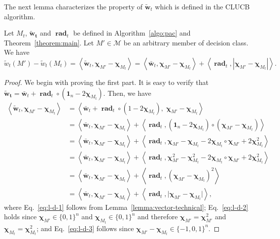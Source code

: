 \documentclass{article}
\newcommand{\junk}[1]{}
\newcommand{\Algorithm}{{\small \textsf{CLUCB}}\xspace}
\newcommand{\M}{\mathcal M}
\DeclareMathOperator{\rad}{rad}
\DeclareMathOperator*{\argmax}{arg\,max}
\newcommand{\inn}[1]{\left\langle #1 \right\rangle}
\renewcommand{\vec}[1]{\boldsymbol{#1}}
\renewcommand{\odot}{\circ}
\begin{document}
The next lemma characterizes the property of $\vec{\tilde w}_t$ which is defined in the \Algorithm algorithm.
\begin{lemma}
Let $M_t$, $\vec{\tilde w_t}$ and $\vec\rad_t$ be defined in Algorithm~\ref{algo:pac} and Theorem~\ref{theorem:main}.
Let $M' \in \M$ be an arbitrary member of decision class.
We have
$$
\tilde w_t(M')-\tilde w_t(M_t) = 
\inn{\vec{\tilde w}_t, \vec \chi_{M'}-\vec \chi_{M_t}} = \inn{\vec {\bar w}_t, \vec \chi_{M'}-\vec\chi_{M_t}}+\inn{\vec \rad_t, |\vec \chi_{M'}-\vec\chi_{M_t}|}.
$$
\label{lemma:tilde}
\end{lemma}
\begin{proof}
We begin with proving the first part.
It is easy to verify that $\vec {\tilde w_t} = \vec {\bar w}_t+ \vec \rad_t \odot (\vec 1_n-2\vec\chi_{M_t})$.
Then, we have
\begin{align}
\inn{\vec{\tilde w}_t, \vec \chi_{M'}-\vec \chi_{M_t}}
&= \inn{\vec {\bar w}_t+ \vec \rad_t \odot (1-2\vec\chi_{M_t}), \;\vec \chi_{M'}-\vec \chi_{M_t}} \nonumber \\
&= \inn{\vec {\bar w}_t,\vec \chi_{M'}-\vec \chi_{M_t}}+\inn{\vec \rad_t, (\vec 1_n-2\vec\chi_{M_t}) \odot (\vec \chi_{M'}-\vec \chi_{M_t})}
\label{eq:l-d-1}\\
&= \inn{\vec {\bar w}_t,\vec \chi_{M'}-\vec \chi_{M_t}}+\inn{\vec \rad_t, \vec\chi_{M'}-\vec\chi_{M_t}-2\vec\chi_{M_t}\odot\vec\chi_{M'}+2\vec\chi_{M_t}^2 } \nonumber\\
&= \inn{\vec {\bar w}_t,\vec \chi_{M'}-\vec \chi_{M_t}}+\inn{\vec \rad_t, \vec\chi_{M'}^2-\vec\chi_{M_t}^2-2\vec\chi_{M_t}\odot\vec\chi_{M'}+2\vec\chi_{M_t}^2 }
\label{eq:l-d-2}\\
&= \inn{\vec {\bar w}_t,\vec \chi_{M'}-\vec \chi_{M_t}}+\inn{\vec \rad_t, (\vec\chi_{M'}-\vec\chi_{M_t})^2}
\nonumber \\ \
&= \inn{\vec {\bar w}_t,\vec \chi_{M'}-\vec \chi_{M_t}}+\inn{\vec \rad_t, \big|\vec\chi_{M'}-\vec\chi_{M_t}\big|},
\label{eq:l-d-3}
\end{align}
where
Eq.~\eqref{eq:l-d-1} follows from Lemma~\ref{lemma:vector-technical};
Eq.~\eqref{eq:l-d-2} holds since $\vec \chi_{M'}\in \{0,1\}^n$ and $\vec \chi_{M_t}\in \{0,1\}^n$
and therefore $\vec\chi_{M'}=\vec\chi_{M'}^2$ and $\vec\chi_{M_t}=\vec\chi_{M_t}^2$;
and Eq.~\eqref{eq:l-d-3} follows since $\vec\chi_{M'}-\vec\chi_{M_t}\in \{-1,0,1\}^n$.
\junk{
Next, recall that $\tilde M_t = \argmax_{M\in \M} \tilde w_t(M)$.
Therefore, we have $\tilde w_t(\tilde M_t) \ge \tilde w_t(M')$.
Subtracting $\tilde w_t(M_t)$ from both sides of the former inequality, we have
\begin{equation}
\tilde w_t(\tilde M_t)-\tilde w_t(M_t) \ge \tilde w_t(M')-\tilde w_t(M_t).
\label{eq:l-d-4}
\end{equation}
The lemma follows by noticing that the left-hand side of Eq.~\eqref{eq:l-d-4} equals to 
$\inn{\vec {\bar w}_t,\vec \chi_{\tilde M_t}-\vec \chi_{M_t}}+\inn{\vec \rad_t, \big|\vec\chi_{\tilde M_t}-\vec\chi_{M_t}\big|}$
and the right-hand side equals to
$\inn{\vec {\bar w}_t,\vec \chi_{M'}-\vec \chi_{M_t}}+\inn{\vec \rad_t, \big|\vec\chi_{M'}-\vec\chi_{M_t}\big|}$.
}
\end{proof}
\end{document}
